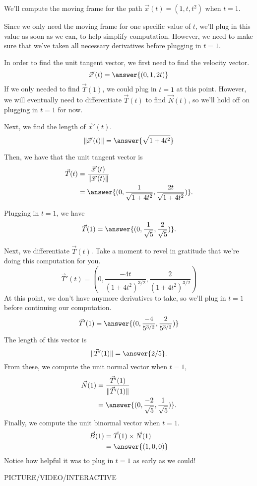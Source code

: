 \documentclass{ximera}
\begin{document}
\begin{example}
We'll compute the moving frame for the path $\vec{x}(t) = (1, t, t^2)$ when $t=1$.

Since we only need the moving frame for one specific value of $t$, we'll plug in this value as soon as we can, to help simplify computation. However, we need to make sure that we've taken all necessary derivatives before plugging in $t=1$.

In order to find the unit tangent vector, we first need to find the velocity vector.
\[
\vec{x}'(t) = \answer{(0, 1, 2t)}
\]
If we only needed to find $\vec{T}(1)$, we could plug in $t=1$ at this point. However, we will eventually need to differentiate $\vec{T}(t)$ to find $\vec{N}(t)$, so we'll hold off on plugging in $t=1$ for now.

Next, we find the length of $\vec{x}'(t)$.
\[
\|\vec{x}'(t)\| = \answer{\sqrt{1+4t^2}}
\]

Then, we have that the unit tangent vector is
\begin{align*}
\vec{T}(t) &= \dfrac{\vec{x}'(t)}{\|\vec{x}'(t)\|}\\
&= \answer{(0,\frac{1}{\sqrt{1+4t^2}}, \frac{2t}{\sqrt{1+4t^2}})}.
\end{align*}

Plugging in $t=1$, we have
\[
\vec{T}(1) = \answer{(0,\frac{1}{\sqrt{5}}, \frac{2}{\sqrt{5}})}.
\]

Next, we differentiate $\vec{T}(t)$. Take a moment to revel in gratitude that we're doing this computation for you.
\[
\vec{T}'(t) = \left(0,\frac{-4t}{(1+4t^2)^{3/2}}, \frac{2}{(1+4t^2)^{3/2}}\right)
\]
At this point, we don't have anymore derivatives to take, so we'll plug in $t=1$ before continuing our computation.
\[
\vec{T}'(1) = \answer{(0,\frac{-4}{5^{3/2}}, \frac{2}{5^{3/2}})}
\]
The length of this vector is
\[
\|\vec{T}'(1)\| = \answer{2/5}.
\]
From these, we compute the unit normal vector when $t=1$,
\begin{align*}
\vec{N}(1) &= \dfrac{\vec{T}'(1)}{\|\vec{T}'(1)\|}\\
&= \answer{(0,\frac{-2}{\sqrt{5}},\frac{1}{\sqrt{5}})}.
\end{align*}
Finally, we compute the unit binormal vector when $t=1$.
\begin{align*}
\vec{B}(1) &= \vec{T}(1)\times\vec{N}(1)\\
&= \answer{(1,0,0)}
\end{align*}
Notice how helpful it was to plug in $t=1$ as early as we could!


PICTURE/VIDEO/INTERACTIVE
\end{example}
\end{document}
